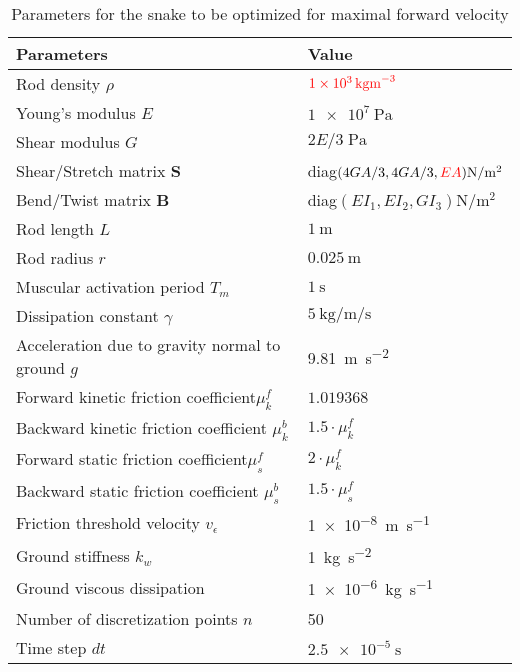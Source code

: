 \documentclass[11pt]{article}
\begin{document}
\begin{table}[htbp]
\caption{\label{tab_opt_snake_params}
Parameters for the snake to be optimized for maximal forward velocity}
\centering
\begin{tabular}{ll}
\toprule
Parameters & Value\\
\midrule
Rod density \(\rho\) & \(\textcolor{red}{\SI{1e3}{\kg \m^{-3}}}\)\\
Young's modulus \(E\) & \(\SI{1e7}{\Pa}\)\\
Shear modulus \(G\) & \(2E/3\;\si{\Pa}\)\\
Shear/Stretch matrix \(\mathbf{S}\) & diag\((4GA/3, 4GA/3, \textcolor{red}{EA}) \si{\N\per\m^2}\)\\
Bend/Twist matrix \(\mathbf{B}\) & diag\((EI_1, EI_2, GI_3) \si{\N\per\m^2}\)\\
Rod length \(L\) & \(\SI{1}{\m}\)\\
Rod radius \(r\) & \(\SI{0.025}{\m}\)\\
Muscular activation period \(T_m\) & \(\SI{1}{\second}\)\\
Dissipation constant \(\gamma\) & \(\SI{5}{\kg\per\m\per\second}\)\\
Acceleration due to gravity normal to ground \(g\) & \SI{9.81}{\m \per \s^2}\\
Forward kinetic friction coefficient\(\mu^f_k\) & \(1.019368\)\\
Backward kinetic friction coefficient \(\mu^b_k\) & \(1.5 \cdot  \mu^f_k\)\\
Forward static friction coefficient\(\mu^f_s\) & \(2 \cdot  \mu^f_k\)\\
Backward static friction coefficient \(\mu^b_s\) & \(1.5 \cdot  \mu^f_s\)\\
Friction threshold velocity \(v_{\epsilon}\) & \SI{1e-8}{\m\per\s}\\
Ground stiffness \(k_w\) & \SI{1}{\kg \per \s^2}\\
Ground viscous dissipation & \SI{1e-6}{\kg \per \s}\\
Number of discretization points \(n\) & 50\\
Time step \(dt\) & \(\SI{2.5e-5}{\second}\)\\
\bottomrule
\end{tabular}
\end{table}
\end{document}
